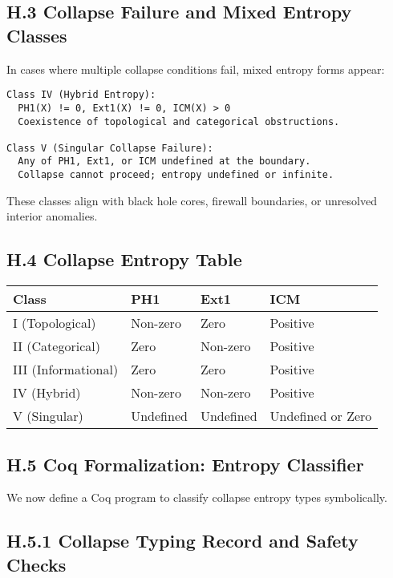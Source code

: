 \documentclass[11pt]{article}
\begin{document}
\subsection*{H.3 Collapse Failure and Mixed Entropy Classes}

In cases where multiple collapse conditions fail, mixed entropy forms appear:

\begin{lstlisting}
Class IV (Hybrid Entropy):
  PH1(X) != 0, Ext1(X) != 0, ICM(X) > 0
  Coexistence of topological and categorical obstructions.

Class V (Singular Collapse Failure):
  Any of PH1, Ext1, or ICM undefined at the boundary.
  Collapse cannot proceed; entropy undefined or infinite.
\end{lstlisting}

These classes align with black hole cores, firewall boundaries, or unresolved interior anomalies.

\subsection*{H.4 Collapse Entropy Table}

\begin{center}
\begin{tabular}{llll}
\toprule
\textbf{Class} & \textbf{PH1} & \textbf{Ext1} & \textbf{ICM} \\
\midrule
I (Topological) & Non-zero & Zero & Positive \\
II (Categorical) & Zero & Non-zero & Positive \\
III (Informational) & Zero & Zero & Positive \\
IV (Hybrid) & Non-zero & Non-zero & Positive \\
V (Singular) & Undefined & Undefined & Undefined or Zero \\
\bottomrule
\end{tabular}
\end{center}

\subsection*{H.5 Coq Formalization: Entropy Classifier}

We now define a Coq program to classify collapse entropy types symbolically.

\subsection*{H.5.1 Collapse Typing Record and Safety Checks}
\end{document}
